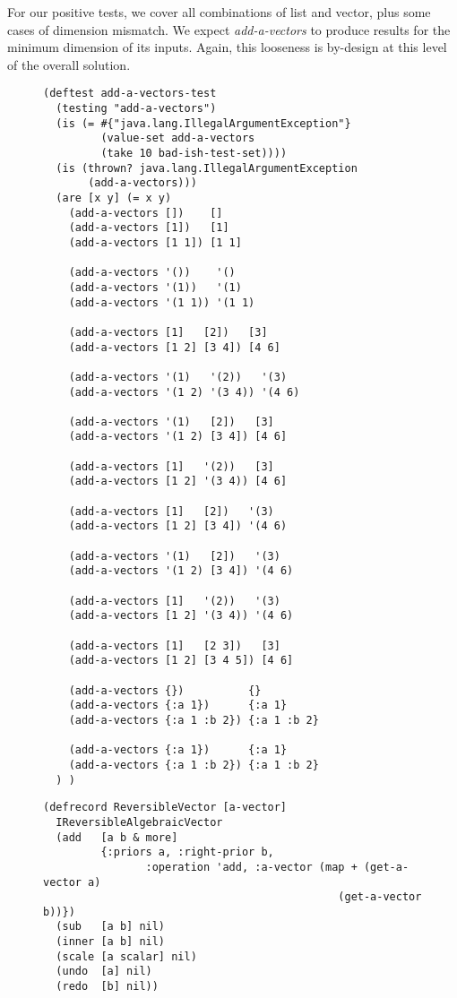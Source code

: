 \documentclass[11pt]{article}
\begin{document}
For our positive tests, we cover all combinations of list and
vector, plus some cases of dimension mismatch. We expect
\emph{add-a-vectors} to produce results for the minimum dimension of its
inputs. Again, this looseness is by-design at this level of the
overall solution.

\begin{figure}[H]
\label{add-a-vectors-test}
\begin{verbatim}
(deftest add-a-vectors-test
  (testing "add-a-vectors")
  (is (= #{"java.lang.IllegalArgumentException"}
         (value-set add-a-vectors
         (take 10 bad-ish-test-set))))
  (is (thrown? java.lang.IllegalArgumentException
       (add-a-vectors)))
  (are [x y] (= x y)
    (add-a-vectors [])    []
    (add-a-vectors [1])   [1]
    (add-a-vectors [1 1]) [1 1]

    (add-a-vectors '())    '()
    (add-a-vectors '(1))   '(1)
    (add-a-vectors '(1 1)) '(1 1)

    (add-a-vectors [1]   [2])   [3]
    (add-a-vectors [1 2] [3 4]) [4 6]

    (add-a-vectors '(1)   '(2))   '(3)
    (add-a-vectors '(1 2) '(3 4)) '(4 6)

    (add-a-vectors '(1)   [2])   [3]
    (add-a-vectors '(1 2) [3 4]) [4 6]

    (add-a-vectors [1]   '(2))   [3]
    (add-a-vectors [1 2] '(3 4)) [4 6]

    (add-a-vectors [1]   [2])   '(3)
    (add-a-vectors [1 2] [3 4]) '(4 6)

    (add-a-vectors '(1)   [2])   '(3)
    (add-a-vectors '(1 2) [3 4]) '(4 6)

    (add-a-vectors [1]   '(2))   '(3)
    (add-a-vectors [1 2] '(3 4)) '(4 6)

    (add-a-vectors [1]   [2 3])   [3]
    (add-a-vectors [1 2] [3 4 5]) [4 6]

    (add-a-vectors {})          {}
    (add-a-vectors {:a 1})      {:a 1}
    (add-a-vectors {:a 1 :b 2}) {:a 1 :b 2}

    (add-a-vectors {:a 1})      {:a 1}
    (add-a-vectors {:a 1 :b 2}) {:a 1 :b 2}
  ) )
\end{verbatim}
\end{figure}


\begin{figure}[H]
\label{reversible-algebraic-vector-on-vector}
\begin{verbatim}
(defrecord ReversibleVector [a-vector]
  IReversibleAlgebraicVector
  (add   [a b & more]
         {:priors a, :right-prior b,
                :operation 'add, :a-vector (map + (get-a-vector a)
                                              (get-a-vector b))})
  (sub   [a b] nil)
  (inner [a b] nil)
  (scale [a scalar] nil)
  (undo  [a] nil)
  (redo  [b] nil))
\end{verbatim}
\end{figure}
\end{document}

